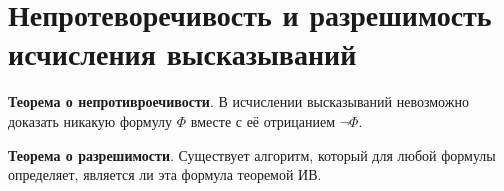 \section{Непротеворечивость и разрешимость исчисления высказываний}
\textbf{Теорема о непротивроечивости}. В исчислении высказываний невозможно доказать никакую формулу $\Phi$ вместе с её отрицанием $\lnot \Phi$.

\textbf{Теорема о разрешимости}. Существует алгоритм, который для любой формулы определяет, является ли эта формула теоремой ИВ.